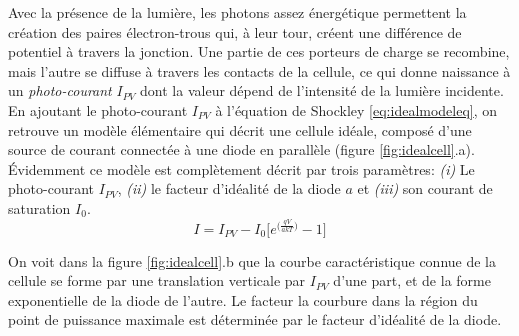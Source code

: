 Avec la présence de la lumière, les photons assez énergétique permettent la création des paires électron-trous qui, à leur tour, créent une différence de potentiel à travers la jonction. Une partie de ces porteurs de charge se recombine, mais l'autre se diffuse à travers les contacts de la cellule, ce qui donne naissance à un \textit{photo-courant} $I_{PV}$  dont la valeur dépend de l'intensité de la lumière incidente.\\
En ajoutant le photo-courant $I_{PV}$ à l'équation de Shockley \ref{eq:idealmodeleq}, on retrouve un modèle élémentaire qui décrit une cellule idéale, composé d'une source de courant connectée à une diode en parallèle (figure \ref{fig:idealcell}.a). Évidemment ce modèle est complètement décrit par trois paramètres: \textit{(i)} Le photo-courant $I_{PV}$, \textit{(ii)} le facteur d'idéalité de la diode $a$ et \textit{(iii)} son courant de saturation $I_0$. 
\begin{equation}
\label{eq:idealmodeleq}
  I = I_{PV} - I_0 \bigg[e^{\big(\frac{qV}{akT}\big)} - 1\bigg]
\end{equation}

On voit dans la figure \ref{fig:idealcell}.b que la courbe caractéristique connue de la cellule se forme par une translation verticale par $I_{PV}$ d'une part, et de la forme exponentielle de la diode de l'autre. Le facteur la courbure dans la région du point de puissance maximale est déterminée par le facteur d'idéalité de la diode.


